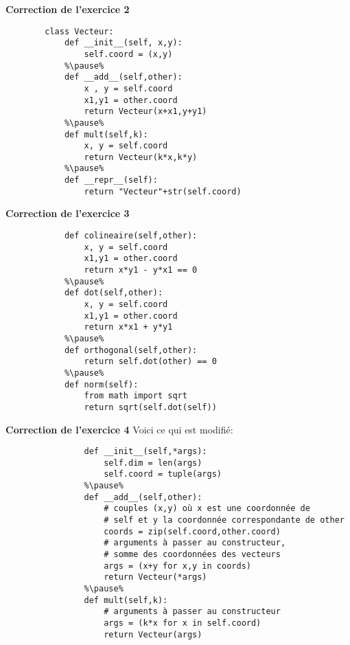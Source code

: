 \begin{frame}[fragile]
	\begin{block}{\textbf{Correction de l'exercice 2}}
		\begin{lstlisting}
		class Vecteur:
			def __init__(self, x,y):
				self.coord = (x,y)
			%\pause%
			def __add__(self,other):
				x , y = self.coord
				x1,y1 = other.coord
				return Vecteur(x+x1,y+y1)
			%\pause%
			def mult(self,k):
				x, y = self.coord
				return Vecteur(k*x,k*y)
			%\pause%
			def __repr__(self):
				return "Vecteur"+str(self.coord)
		\end{lstlisting}
	\end{block}
\end{frame}

\begin{frame}[fragile]
	\begin{block}{\textbf{Correction de l'exercice 3}}
		\begin{lstlisting}
			def colineaire(self,other):
				x, y = self.coord
				x1,y1 = other.coord
				return x*y1 - y*x1 == 0
			%\pause%
			def dot(self,other):
				x, y = self.coord
				x1,y1 = other.coord
				return x*x1 + y*y1
			%\pause%
			def orthogonal(self,other):
				return self.dot(other) == 0
			%\pause%
			def norm(self):
				from math import sqrt
				return sqrt(self.dot(self))
		\end{lstlisting}
	\end{block}
\end{frame}

\begin{frame}[fragile]
	\begin{block}{\textbf{Correction de l'exercice 4}}
		Voici ce qui est modifié:
		\begin{lstlisting}
				def __init__(self,*args):
					self.dim = len(args)
					self.coord = tuple(args)
				%\pause%
				def __add__(self,other):
					# couples (x,y) où x est une coordonnée de 
					# self et y la coordonnée correspondante de other
					coords = zip(self.coord,other.coord)
					# arguments à passer au constructeur,
					# somme des coordonnées des vecteurs
					args = (x+y for x,y in coords)
					return Vecteur(*args)
				%\pause%
				def mult(self,k):
					# arguments à passer au constructeur
					args = (k*x for x in self.coord)
					return Vecteur(args)
		\end{lstlisting}
	\end{block}
\end{frame}


